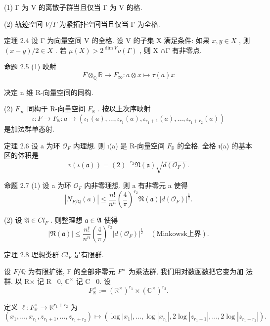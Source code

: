 \documentclass[]{article}
\begin{document}
{(1) Γ 为 V 的离散子群当且仅当 Γ 为 V 的格. 

(2) 轨迹空间 $V / \Gamma$ 为紧拓扑空间当且仅当 Γ 为全格. 

定理 2.4 设 Γ 为向量空间 V 的全格. 设 V 的子集 X 满足条件: 如果 $x , y \in X$ , 则 $( x - y ) / 2 \in X$ . 若 $\mu ( X ) > 2 ^ { \dim V } v ( \Gamma )$ , 则 X ∩Γ 有非零点. 

命题 2.5 (1) 映射 $$
F \otimes_ {\mathbb {Q}} \mathbb {R} \to F _ {\infty}: a \otimes x \mapsto \tau (a) x
$$

决定 n 维 R-向量空间的同构. 

(2) $F _ { \infty }$ 同构于 R-向量空间 $F _ { \mathbb { R } }$ . 按以上次序映射 $$
\iota : F \to F _ {\mathbb {R}}: a \mapsto (\iota_ {1} (a), \dots , \iota_ {r _ {1}} (a), \iota_ {r _ {1} + 1} (a), \dots , \iota_ {r _ {1} + r _ {2}} (a))
$$是加法群单态射. 


定理 2.6 设 a 为环 ${ \mathcal { O } } _ { F }$ 内理想. 则 ι(a) 是 R-向量空间 $F _ { \mathbb { R } }$ 的全格. 全格 ι(a) 的基本 区的体积是 $$
v (\iota (\mathfrak {a})) = (2) ^ {- r _ {2}} \mathfrak {N} (\mathfrak {a}) \sqrt {d (\mathcal {O} _ {F})}.
$$

命题 2.7 (1) 设 a 为环 ${ \mathcal { O } } _ { F }$ 内非零理想. 则 a 有非零元 a 使得 $$
\left| N _ {F / \mathbb {Q}} (a) \right| \leqslant \frac {n !}{n ^ {n}} \left(\frac {4}{\pi}\right) ^ {r _ {2}} \mathfrak {N} (\mathfrak {a}) \left| d \left(\mathcal {O} _ {F}\right) \right| ^ {\frac {1}{2}}.
$$

(2) 设 $\mathfrak { A } \in C l _ { F }$ . 则整理想 ${ \mathfrak { a } } \in { \mathfrak { A } }$ 使得 $$
| \mathfrak {N} (\mathfrak {a}) | \leqslant {\frac {n !}{n ^ {n}}} \left({\frac {4}{\pi}}\right) ^ {r _ {2}} | d ({\mathcal {O}} _ {F}) | ^ {\frac {1}{2}} \quad ({\mathrm{Minkowsk}}   \text {上界}).
$$

定理 2.8 理想类群 $C l _ { F }$ 是有限群.

设 $F / \mathbb { Q }$ 为有限扩张, F 的全部非零元 $F ^ { \times }$ 为乘法群, 我们用对数函数把它变为加 法群. 以 R× 记 R \ {0}, $\mathbb { C } ^ { \times }$ 记 C \ {0}. 设  $$
F _ {\mathbb {R}} ^ {\times} := \left(\mathbb {R} ^ {\times}\right) ^ {r _ {1}} \times \left(\mathbb {C} ^ {\times}\right) ^ {r _ {2}}.
$$

定义 $\ell : F _ { \mathbb { R } } ^ { \times } \to \mathbb { R } ^ { r _ { 1 } + r _ { 2 } }$ 为 $$
\left(x _ {1}, \dots , x _ {r _ {1}}, z _ {r _ {1} + 1}, \dots , z _ {r _ {1} + r _ {2}}\right) \mapsto (\log | x _ {1} |, \dots , \log | x _ {r _ {1}} |, 2 \log | z _ {r _ {1} + 1} |, \dots , 2 \log | z _ {r _ {1} + r _ {2}} |).
$$

}
\end{document}
